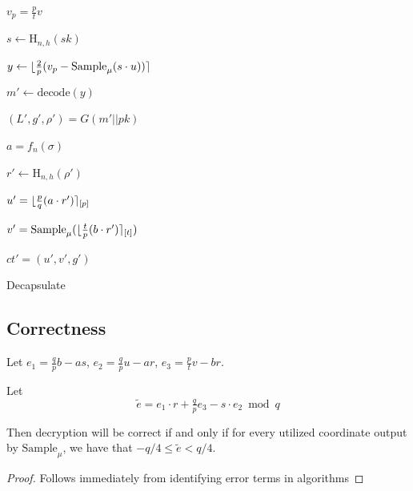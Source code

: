 \begin{algorithm}

    $v_{p}=\tfrac{p}{t}v$\

    $s \gets \text{H}_{n,h}(sk)$\

    $y \gets \lfloor\tfrac{2}{p}(v_{p}-\text{Sample}_{\mu}(s\cdot
      u))\rceil$\

    $m' \gets \text{decode}(y)$

    $(L',g',\rho')=G(m'||pk)$\

    $a=f_{n}(\sigma)$\
    
    $r' \gets \text{H}_{n,h}(\rho')$\

    $u'=\lfloor\tfrac{p}{q}(a\cdot r')\rceil_{[p]}$\

    $v'=\text{Sample}_{\mu}(\lfloor\tfrac{t}{p} (b \cdot r')\rceil_{[t]})$\

    $ct'=(u',v',g')$\


    \caption{Decapsulate}
\end{algorithm}


\subsection{Correctness}
\label{sec:correctness}

\begin{lemma}
\label{lem:correctness}
Let $e_1 = \tfrac{q}{p}b-as$, $e_2=\tfrac{q}{p}u-ar$,
$e_3=\tfrac{p}{t}v-br$. 

Let
\begin{equation*}
\label{eq:erroroverall}
\tilde{e}=e_1\cdot r+\tfrac{q}{p}e_3-s\cdot e_2 \bmod{q}
\end{equation*}

Then decryption will be correct if and only if for every utilized
coordinate output by $\text{Sample}_{\mu}$, we have that $-q/4 \leq
\tilde{e} < q/4$. 
\end{lemma}

\begin{proof}
Follows immediately from identifying error terms in algorithms
\end{proof}

